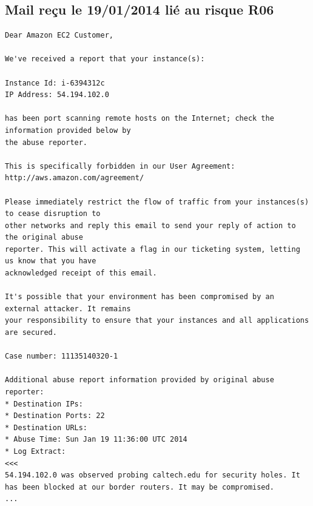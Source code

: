 \documentclass[a4paper,11pt,french]{article}
\begin{document}
\subsection{Mail reçu le 19/01/2014 lié au risque R06}
\begin{verbatim}
Dear Amazon EC2 Customer,

We've received a report that your instance(s):

Instance Id: i-6394312c
IP Address: 54.194.102.0

has been port scanning remote hosts on the Internet; check the information provided below by 
the abuse reporter.

This is specifically forbidden in our User Agreement: http://aws.amazon.com/agreement/

Please immediately restrict the flow of traffic from your instances(s) to cease disruption to 
other networks and reply this email to send your reply of action to the original abuse 
reporter. This will activate a flag in our ticketing system, letting us know that you have 
acknowledged receipt of this email.

It's possible that your environment has been compromised by an external attacker. It remains 
your responsibility to ensure that your instances and all applications are secured.

Case number: 11135140320-1

Additional abuse report information provided by original abuse reporter:
* Destination IPs: 
* Destination Ports: 22
* Destination URLs: 
* Abuse Time: Sun Jan 19 11:36:00 UTC 2014
* Log Extract: 
<<<
54.194.102.0 was observed probing caltech.edu for security holes. It
has been blocked at our border routers. It may be compromised.
...
\end{verbatim}
\end{document}
